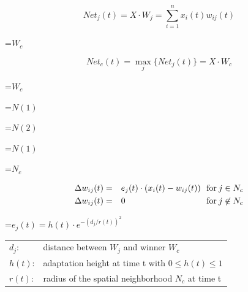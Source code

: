 {\newpage
\clearpage
\samepage \begin{displaymath}Net_j(t) = X \cdot W_j = \sum_{i=1}^n x_i(t) w_{ij}(t) \end{displaymath}
}

{\newpage
\clearpage
\samepage \setbox\sizebox=\hbox{$W_c$}\box\sizebox
}

{\newpage
\clearpage
\samepage \begin{displaymath}Net_c(t) = \max_j \{ Net_j(t) \} = X\cdot W_c\end{displaymath}
}

{\newpage
\clearpage
\samepage \setbox\sizebox=\hbox{$W_c$}\box\sizebox
}

{\newpage
\clearpage
\samepage \setbox\sizebox=\hbox{$N(1)$}\box\sizebox
}

{\newpage
\clearpage
\samepage \setbox\sizebox=\hbox{$N(2)$}\box\sizebox
}

{\newpage
\clearpage
\samepage \setbox\sizebox=\hbox{$N(1)$}\box\sizebox
}

{\newpage
\clearpage
\samepage \setbox\sizebox=\hbox{$N_c$}\box\sizebox
}

{\newpage
\clearpage
\samepage \begin{eqnarray*}\Delta w_{ij}(t) & = & e_j(t)\cdot(x_i(t)-w_{ij}(t)) }\hfill{ \hbox{~~for}\:j\in N_c\\  
\Delta w_{ij}(t) & = & 0 }\hfill{ \hbox{~~for}\:j \not\in N_c\\ 
\end{eqnarray*}
}

{\newpage
\clearpage
\samepage \setbox\sizebox=\hbox{$e_j(t) = h(t) \cdot e^{-(d_j/r(t))^2}$}\box\sizebox
}

{\newpage
\clearpage
\samepage \begin{tabular}{ll}
$d_j$:     & distance between $W_j$ and winner $W_c$\\ 
$h(t)$:    & adaptation height at time t with $0\leq h(t)\leq 1$\\ 
$r(t)$:    & radius of the spatial neighborhood $N_c$ at time t\\ 
\end{tabular}
}

